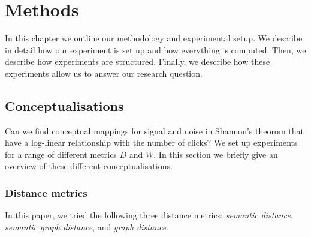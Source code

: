 \section{Methods}
\label{sec:methods}
In this chapter we outline our methodology and experimental setup. We describe in detail how our experiment is set up and how everything is computed. Then, we describe how experiments are structured. Finally, we describe how these experiments allow us to answer our research question.

\subsection{Conceptualisations}
Can we find conceptual mappings for signal and noise in Shannon's theorom that have a log-linear relationship with the number of clicks?
We set up experiments for a range of different metrics $D$ and $W$. In this section we briefly give an overview of these different conceptualisations.

\subsubsection{Distance metrics}
In this paper, we tried the following three distance metrics: \emph{semantic distance}, \emph{semantic graph distance}, and \emph{graph distance}.

